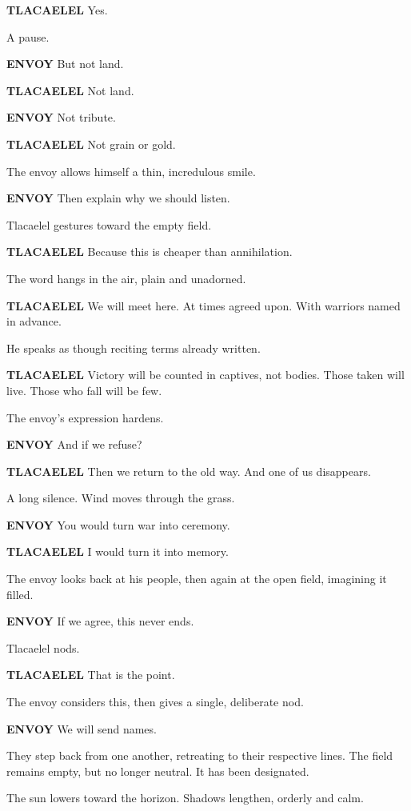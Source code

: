 \documentclass[12pt]{article}
\begin{document}
\textbf{TLACAELEL}  
Yes.

A pause.

\textbf{ENVOY}  
But not land.

\textbf{TLACAELEL}  
Not land.

\textbf{ENVOY}  
Not tribute.

\textbf{TLACAELEL}  
Not grain or gold.

The envoy allows himself a thin, incredulous smile.

\textbf{ENVOY}  
Then explain why we should listen.

Tlacaelel gestures toward the empty field.

\textbf{TLACAELEL}  
Because this is cheaper than annihilation.

The word hangs in the air, plain and unadorned.

\textbf{TLACAELEL}  
We will meet here.  
At times agreed upon.  
With warriors named in advance.  

He speaks as though reciting terms already written.

\textbf{TLACAELEL}  
Victory will be counted in captives, not bodies.  
Those taken will live.  
Those who fall will be few.

The envoy’s expression hardens.

\textbf{ENVOY}  
And if we refuse?

\textbf{TLACAELEL}  
Then we return to the old way.  
And one of us disappears.

A long silence. Wind moves through the grass.

\textbf{ENVOY}  
You would turn war into ceremony.

\textbf{TLACAELEL}  
I would turn it into memory.

The envoy looks back at his people, then again at the open field, imagining it filled.

\textbf{ENVOY}  
If we agree, this never ends.

Tlacaelel nods.

\textbf{TLACAELEL}  
That is the point.

The envoy considers this, then gives a single, deliberate nod.

\textbf{ENVOY}  
We will send names.

They step back from one another, retreating to their respective lines. The field remains empty, but no longer neutral. It has been designated.

The sun lowers toward the horizon. Shadows lengthen, orderly and calm.
\end{document}
